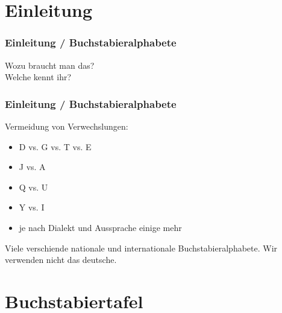 

\subtitle{Betriebstechnik/Vorschriften 02:         \\
          Das ``Internationale Buchstabieralphabet'' \\[2em]}
\date{Stand 22.10.2015}



\section*{Einleitung}

\begin{frame}
    \frametitle{Einleitung / Buchstabieralphabete}
    \begin{center}
        \Large{Wozu braucht man das?} \\
        \Large{Welche kennt ihr?}
    \end{center}
\end{frame}

\begin{frame}
    \frametitle{Einleitung / Buchstabieralphabete}

    Vermeidung von Verwechslungen:

    \begin{itemize}
        \item D vs. G vs. T vs. E
        \item J vs. A
        \item Q vs. U
        \item Y vs. I
        \item je nach Dialekt und Aussprache einige mehr
    \end{itemize}

    Viele verschiende nationale und internationale Buchstabieralphabete. Wir
    verwenden nicht das deutsche.

\end{frame}

\section*{Buch\-stabier\-tafel}

